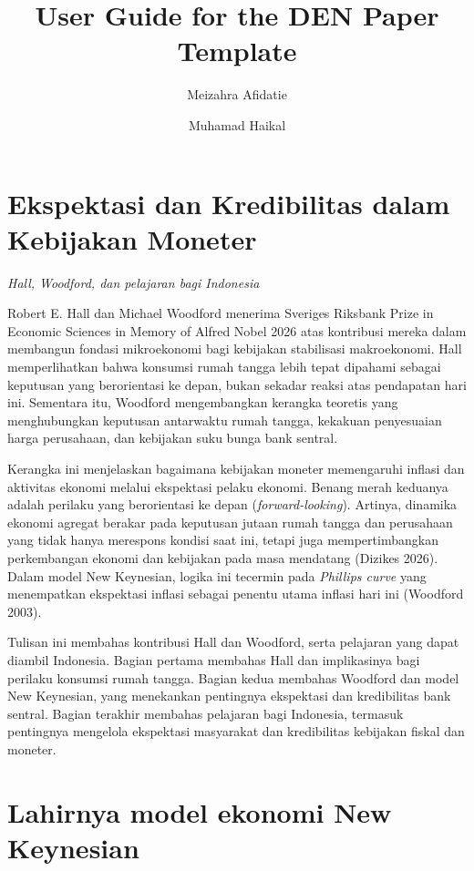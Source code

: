 \documentclass[
  manuscript=article,
  layout=brief,
  year=2026,
  volume=1,
]{den}
\title{User Guide for the DEN Paper Template}
\author{Meizahra Afidatie \orcid{true}}
\affiliation{Dewan Ekonomi Nasional}
\author{Muhamad Haikal \orcid{true}}
\affiliation{Institution-2, City, Country}
\begin{document}
\section{Ekspektasi dan Kredibilitas dalam Kebijakan
Moneter}\label{ekspektasi-dan-kredibilitas-dalam-kebijakan-moneter}

\emph{Hall, Woodford, dan pelajaran bagi Indonesia}

Robert E. Hall dan Michael Woodford menerima Sveriges Riksbank Prize in
Economic Sciences in Memory of Alfred Nobel 2026 atas kontribusi mereka
dalam membangun fondasi mikroekonomi bagi kebijakan stabilisasi
makroekonomi. Hall memperlihatkan bahwa konsumsi rumah tangga lebih
tepat dipahami sebagai keputusan yang berorientasi ke depan, bukan
sekadar reaksi atas pendapatan hari ini. Sementara itu, Woodford
mengembangkan kerangka teoretis yang menghubungkan keputusan antarwaktu
rumah tangga, kekakuan penyesuaian harga perusahaan, dan kebijakan suku
bunga bank sentral.

Kerangka ini menjelaskan bagaimana kebijakan moneter memengaruhi inflasi
dan aktivitas ekonomi melalui ekspektasi pelaku ekonomi. Benang merah
keduanya adalah perilaku yang berorientasi ke depan
(\emph{forward-looking}). Artinya, dinamika ekonomi agregat berakar pada
keputusan jutaan rumah tangga dan perusahaan yang tidak hanya merespons
kondisi saat ini, tetapi juga mempertimbangkan perkembangan ekonomi dan
kebijakan pada masa mendatang (Dizikes 2026). Dalam model New Keynesian,
logika ini tecermin pada \emph{Phillips curve} yang menempatkan
ekspektasi inflasi sebagai penentu utama inflasi hari ini (Woodford
2003).

Tulisan ini membahas kontribusi Hall dan Woodford, serta pelajaran yang
dapat diambil Indonesia. Bagian pertama membahas Hall dan implikasinya
bagi perilaku konsumsi rumah tangga. Bagian kedua membahas Woodford dan
model New Keynesian, yang menekankan pentingnya ekspektasi dan
kredibilitas bank sentral. Bagian terakhir membahas pelajaran bagi
Indonesia, termasuk pentingnya mengelola ekspektasi masyarakat dan
kredibilitas kebijakan fiskal dan moneter.

\section{Lahirnya model ekonomi New
Keynesian}\label{lahirnya-model-ekonomi-new-keynesian}
\end{document}
